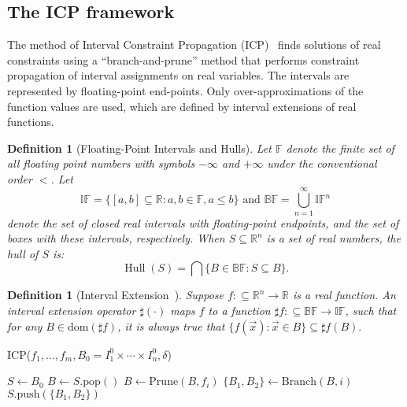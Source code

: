 \documentclass[12pt]{article}
\newcommand{\dom}{\mbox{dom}}
\newtheorem{definition}[theorem]{Definition}
\DeclareMathOperator{\Hull}{Hull}
\begin{document}
\subsection{The ICP framework}

The method of Interval Constraint Propagation (ICP)~\cite{handbookICP} finds solutions of real constraints using a ``branch-and-prune'' method that performs constraint propagation of interval assignments on real variables. The intervals are represented by floating-point end-points. Only over-approximations of the function values are used, which are defined by interval extensions of real functions.
\begin{definition}[Floating-Point Intervals and Hulls]
Let $\mathbb{F}$ denote the finite set of all floating point numbers with symbols $-\infty$ and $+\infty$ under the conventional order $<$. Let
$$\mathbb{IF} = \{[a,b]\subseteq \mathbb{R}: a,b\in \mathbb{F}, a\leq b\}\mbox{ and } \mathbb{BF} = \bigcup_{n=1}^{\infty}\mathbb{IF}^n$$ denote the set of closed real intervals with floating-point endpoints, and the set of {\em boxes} with these intervals, respectively. When $S\subseteq \mathbb{R}^n$ is a set of real numbers, the hull of $S$ is:
$$\Hull(S) = \bigcap \{B\in \mathbb{BF}: S\subseteq B\}.$$
\end{definition}
\begin{definition}[Interval Extension~\cite{handbookICP}]
Suppose $f:\subseteq\mathbb{R}^n\rightarrow \mathbb{R}$ is a real function. An interval extension operator $\sharp(\cdot)$ maps $f$ to a function $\sharp f:\subseteq \mathbb{BF}\rightarrow \mathbb{IF}$, such that
for any $B\in \dom(\sharp f)$, it is always true that $\{f(\vec x):\vec x\in B\}\subseteq \sharp f(B).$
\end{definition}
\begin{algorithm}\label{algo1}
\caption{ICP($f_1,...,f_m, B_0 = I_1^0\times\cdots\times I_n^0, \delta$)}\label{icpalgo}
\begin{algorithmic}[1]
\Statex
    \State $S \gets B_0$
        \State $B \gets S.\mathrm{pop}()$
        \State $B \gets \mathrm{Prune}(B, f_i)$
        \EndWhile
                \State $\{B_1,B_2\} \gets \mathrm{Branch}(B, i)$
                \State $S.\mathrm{push}(\{B_1,B_2\})$
            \Else
                \State {}
            \EndIf
        \EndIf
    \EndWhile
    \State {}
\end{algorithmic}
\end{algorithm}
\end{document}
